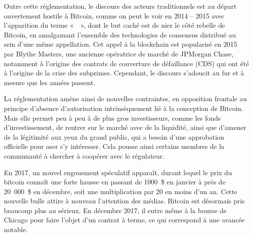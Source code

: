 Outre cette réglementation, le discours des acteurs traditionnels est au départ ouvertement hostile à Bitcoin, comme on peut le voir en 2014 -- 2015 avec l'apparition du terme «~~», dont le but caché est de nier le côté rebelle de Bitcoin, en amalgamant l'ensemble des technologies de consensus distribué au sein d'une même appellation. Cet appel à la blockchain est popularisé en 2015 par Blythe Masters, une ancienne opératrice de marché de JPMorgan Chase, notamment à l'origine des contrats de couverture de défaillance (CDS) qui ont été à l'origine de la crise des subprimes. Cependant, le discours s'adoucit au fur et à mesure que les années passent. %

La réglementation amène ainsi de nouvelles contraintes, en opposition frontale au principe d'absence d'autorisation intrinsèquement lié à la conception de Bitcoin. Mais elle permet peu à peu à de plus gros investisseurs, comme les fonds d'investissement, de rentrer sur le marché avec de la liquidité, ainsi que d'amener de la légitimité aux yeux du grand public, qui a besoin d'une approbation officielle pour oser s'y intéresser. Cela pousse ainsi certains membres de la communauté à chercher à coopérer avec le régulateur. %

En 2017, un nouvel engouement spéculatif apparaît, durant lequel le prix du bitcoin connaît une forte hausse en passant de 1000~\$ en janvier à près de 20~000~\$ en décembre, soit une multiplication par 20 en moins d'un an. Cette nouvelle bulle attire à nouveau l'attention des médias. Bitcoin est désormais pris beaucoup plus au sérieux. En décembre 2017, il entre même à la bourse de Chicago pour faire l'objet d'un contrat à terme, ce qui correspond à une avancée notable.

